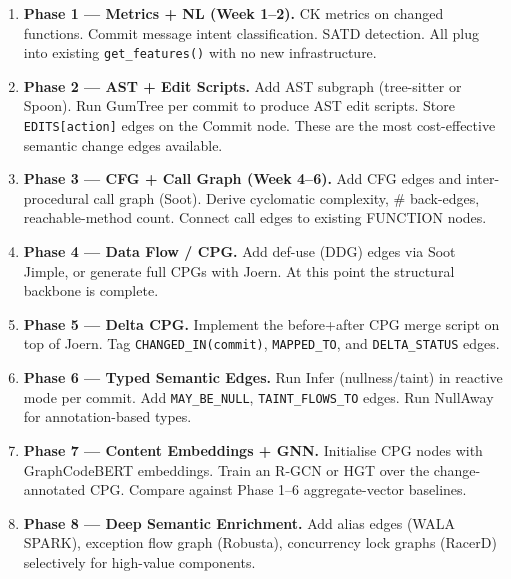 \documentclass[12pt,a4paper]{article}
\begin{document}
\begin{enumerate}[leftmargin=1.5em]
  \item \textbf{Phase 1 --- Metrics + NL (Week 1--2).}
        CK metrics on changed functions. Commit message intent classification.
        SATD detection. All plug into existing \texttt{get\_features()} with no
        new infrastructure.

  \item \textbf{Phase 2 --- AST + Edit Scripts.}
        Add AST subgraph (tree-sitter or Spoon). Run GumTree per commit to produce
        AST edit scripts. Store \texttt{EDITS[action]} edges on the Commit node.
        These are the most cost-effective semantic change edges available.

  \item \textbf{Phase 3 --- CFG + Call Graph (Week 4--6).}
        Add CFG edges and inter-procedural call graph (Soot). Derive cyclomatic
        complexity, \# back-edges, reachable-method count. Connect call edges to
        existing FUNCTION nodes.

  \item \textbf{Phase 4 --- Data Flow / CPG.}
        Add def-use (DDG) edges via Soot Jimple, or generate full CPGs with Joern.
        At this point the structural backbone is complete.

  \item \textbf{Phase 5 --- Delta CPG.}
        Implement the before+after CPG merge script on top of Joern. Tag
        \texttt{CHANGED\_IN(commit)}, \texttt{MAPPED\_TO}, and
        \texttt{DELTA\_STATUS} edges.

  \item \textbf{Phase 6 --- Typed Semantic Edges.}
        Run Infer (nullness/taint) in reactive mode per commit. Add
        \texttt{MAY\_BE\_NULL}, \texttt{TAINT\_FLOWS\_TO} edges. Run NullAway for
        annotation-based types.

  \item \textbf{Phase 7 --- Content Embeddings + GNN.}
        Initialise CPG nodes with GraphCodeBERT embeddings. Train an R-GCN or HGT
        over the change-annotated CPG. Compare against Phase 1--6 aggregate-vector
        baselines.

  \item \textbf{Phase 8 --- Deep Semantic Enrichment.}
        Add alias edges (WALA SPARK), exception flow graph (Robusta), concurrency
        lock graphs (RacerD) selectively for high-value components.
\end{enumerate}
\end{document}
